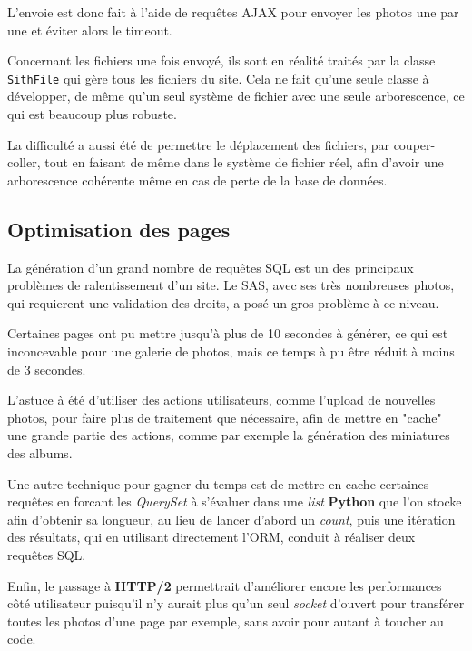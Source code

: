 \documentclass[a4paper]{report}
\begin{document}
\par L'envoie est donc fait à l'aide de requêtes AJAX pour envoyer les photos une par une et éviter alors le timeout.

\par Concernant les fichiers une fois envoyé, ils sont en réalité traités par la classe \verb#SithFile# qui gère tous
les fichiers du site. Cela ne fait qu'une seule classe à développer, de même qu'un seul système de fichier avec une
seule arborescence, ce qui est beaucoup plus robuste.

\par La difficulté a aussi été de permettre le déplacement des fichiers, par couper-coller, tout en faisant de même dans
le système de fichier réel, afin d'avoir une arborescence cohérente même en cas de perte de la base de données.

\subsection{Optimisation des pages}
\label{sub:optimisation_des_pages}
\par La génération d'un grand nombre de requêtes SQL est un des principaux problèmes de ralentissement d'un site. Le
SAS, avec ses très nombreuses photos, qui requierent une validation des droits, a posé un gros problème à ce niveau.

\par Certaines pages ont pu mettre jusqu'à plus de 10 secondes à générer, ce qui est inconcevable pour une galerie de
photos, mais ce temps à pu être réduit à moins de 3 secondes.

\par L'astuce à été d'utiliser des actions utilisateurs, comme l'upload de nouvelles photos, pour faire plus de
traitement que nécessaire, afin de mettre en "cache" une grande partie des actions, comme par exemple la génération des
miniatures des albums.

\par Une autre technique pour gagner du temps est de mettre en cache certaines requêtes en forcant les \emph{QuerySet}
à s'évaluer dans une \emph{list} \textbf{Python} que l'on stocke afin d'obtenir sa longueur, au lieu de lancer d'abord
un \emph{count}, puis une itération des résultats, qui en utilisant directement l'ORM, conduit à réaliser deux
requêtes SQL.

\par Enfin, le passage à \textbf{HTTP/2} permettrait d'améliorer encore les performances côté utilisateur puisqu'il n'y
aurait plus qu'un seul \emph{socket} d'ouvert pour transférer toutes les photos d'une page par exemple, sans avoir
pour autant à toucher au code.
\end{document}
